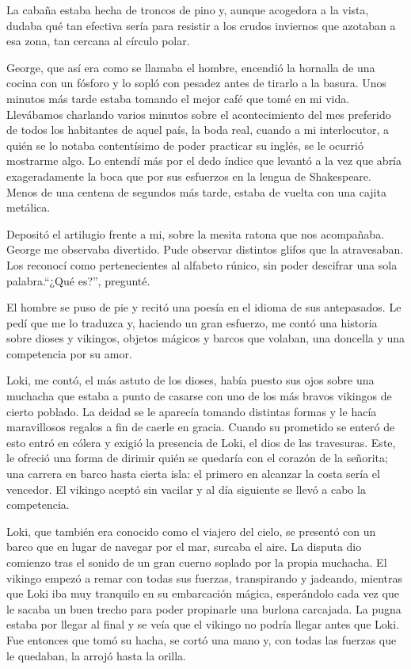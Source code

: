 \documentclass[11pt,twoside,openright,a6paper]{book}
\begin{document}
La cabaña estaba hecha de troncos de pino y, aunque acogedora a la vista, dudaba qué tan efectiva sería para resistir a los crudos inviernos que azotaban a esa zona, tan cercana al círculo polar.

George, que así era como se llamaba el hombre, encendió la hornalla de una cocina con un fósforo y lo sopló con pesadez antes de tirarlo a la basura. Unos minutos más tarde estaba tomando el mejor café que tomé en mi vida. Llevábamos charlando varios minutos sobre el acontecimiento del mes preferido de todos los habitantes de aquel país, la boda real, cuando a mi interlocutor, a quién se lo notaba contentísimo de poder practicar su inglés, se le ocurrió mostrarme algo. Lo entendí más por el dedo índice que levantó a la vez que abría exageradamente la boca que por sus esfuerzos en la lengua de Shakespeare. Menos de una centena de segundos más tarde, estaba de vuelta con una cajita metálica.

Depositó el artilugio frente a mi, sobre la mesita ratona que nos acompañaba. George me observaba divertido. Pude observar distintos glifos que la atravesaban. Los reconocí como pertenecientes al alfabeto rúnico, sin poder descifrar una sola palabra.“¿Qué es?”, pregunté.

El hombre se puso de pie y recitó una poesía en el idioma de sus antepasados. Le pedí que me lo traduzca y, haciendo un gran esfuerzo, me contó una historia sobre dioses y vikingos, objetos mágicos y barcos que volaban, una doncella y una competencia por su amor.

Loki, me contó, el más astuto de los dioses, había puesto sus ojos sobre una muchacha que estaba a punto de casarse con uno de los más bravos vikingos de cierto poblado. La deidad se le aparecía tomando distintas formas y le hacía maravillosos regalos a fin de caerle en gracia. Cuando su prometido se enteró de esto entró en cólera y exigió la presencia de Loki, el dios de las travesuras. Este, le ofreció una forma de dirimir quién se quedaría con el corazón de la señorita; una carrera en barco hasta cierta isla: el primero en alcanzar la costa sería el vencedor. El vikingo aceptó sin vacilar y al día siguiente se llevó a cabo la competencia.

Loki, que también era conocido como el viajero del cielo, se presentó con un barco que en lugar de navegar por el mar, surcaba el aire. La disputa dio comienzo tras el sonido de un gran cuerno soplado por la propia muchacha. El vikingo empezó a remar con todas sus fuerzas, transpirando y jadeando, mientras que Loki iba muy tranquilo en su embarcación mágica, esperándolo cada vez que le sacaba un buen trecho para poder propinarle una burlona carcajada. La pugna estaba por llegar al final y se veía que el vikingo no podría llegar antes que Loki. Fue entonces que tomó su hacha, se cortó una mano y, con todas las fuerzas que le quedaban, la arrojó hasta la orilla.
\end{document}
